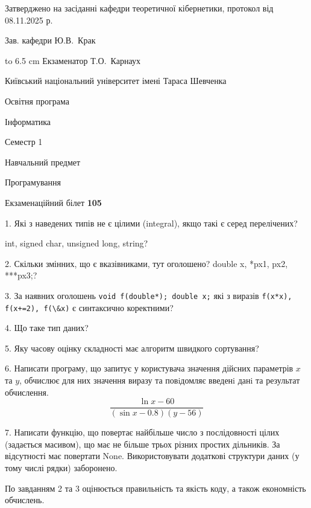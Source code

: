 \documentclass[12pt, ukrainian]{article}
\def\code#1{\Verb!#1!}
\begin{document}
{\smallskip\smallskip \begin {scriptsize} Затверджено на засіданні кафедри теоретичної кібернетики, протокол   від   08.11.2025 р.\par\smallskip\smallskip\smallskip\smallskip
{\parbox {6.5 cm} {Зав. кафедри \dotfill Ю.В.~Крак}}\hspace {0.7cm} {\hbox to 6.5 cm { Екзаменатор \dotfill Т.О.~Карнаух}} \end{scriptsize}}
\newpage
{{\begin {scriptsize}\par
{ \center  Київський національний університет імені Тараса Шевченка \par}
{\parbox {5 cm}{Освітня програма \hfill}{\parbox {7 cm}{Інформатика\hfill}}\parbox {6 cm}{\hfill Семестр 1}}\par
{\parbox {5 cm} {Навчальний предмет \hfill}\parbox {7 cm}{Програмування \hfill}\parbox {6cm}{\hfill}\par}\vspace{-15pt} \end{scriptsize}}{\center Екзаменаційний білет \No \textbf { 105 }\par}}
{%
1. Які з наведених типів не є цілими (integral), якщо такі є серед перелічених?

int, signed char, unsigned long, string?
\par
\vspace{2mm}
2. Скільки змінних, що є вказівниками, тут оголошено?
double x, *px1, px2, ***px3;?
\par
\vspace{2mm}
3. За наявних оголошень \code{void f(double*); double x;} які з виразів \code{f(x*x), f(x+=2), f(\&x)} є синтаксично коректними?
\par
\vspace{2mm}
4. Що таке тип даних?
\par
\vspace{2mm}
5. Яку часову оцінку складності має алгоритм швидкого сортування?
\par
\vspace{2mm}
6. Написати програму, що запитує у користувача значення дійсних параметрів $x$ та $y$, обчислює для них значення виразу та повiдомляє введенi данi та результат обчислення.
$$\frac{\ln x - 60}{(\sin x - 0.8) (y - 56)}$$ 

\par
7. Написати функцію, що повертає найбільше число з послідовності цілих (задається масивом), що має не більше трьох різних простих дільників. За відсутності має повертати None. Використовувати додаткові структури даних (у тому числі рядки) заборонено.

По завданням 2 та 3 оцінюється правильність та якість коду, а також економність обчислень.

}
\end{document}
